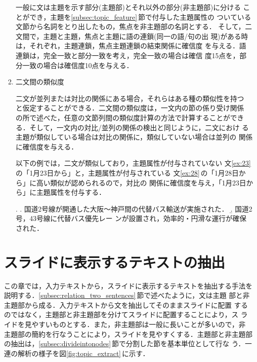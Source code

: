 \begin{enumerate}
      一般に文は主題を示す部分(主題部)とそれ以外の部分(非主題部)に分ける
      ことができ，主題を\ref{subsec:topic_feature}\,節で付与した主題属性の
      ついている文節から名詞をとり出したもの，焦点を非主題部の名詞とする．
      そして，二文間で，主題と主題，焦点と主題に語の連鎖(同一の語/句の出
      現)がある時は，それぞれ，主題連鎖，焦点主題連鎖の結束関係に確信度
      を与える．語連鎖は，完全一致と部分一致を考え，完全一致の場合は確信
      度15点を，部分一致の場合は確信度10点を与える．

\item 二文間の類似度

      二文が並列または対比の関係にある場合，それらはある種の類似性を持つ
      と仮定することができる．二文間の類似度は，一文内の節の係り受け関係
      の所で述べた，任意の文節列間の類似度計算の方法で計算することができ
      る．そして，一文内の対比/並列の関係の検出と同じように，二文におけ
      る主題が類似している場合は対比の関係に，類似していない場合は並列の
      関係に確信度を与える．

      以下の例では，二文が類似しており，主題属性が付与されていない
      文\ref{ex:23}\,の「1月23日から」と，主題属性が付与されている
      文\ref{ex:28}\,の「1月28日から」に高い類似が認められるので，対比の
      関係に確信度を与え，「1月23日から」に主題属性を付与する．

\ex. \a. 国道2号線が開通した大阪〜神戸間の代替バス輸送が実施された． \label{ex:23}
 \b. 国道2号，43号線に代替バス優先レー
      ンが設置され，効率的・円滑な運行が確保された．\label{ex:28}\\
\par

\end{enumerate}

\section{スライドに表示するテキストの抽出}
\label{sec:topic_extract}

この章では，入力テキストから，スライドに表示するテキストを抽出する手法を
説明する．\ref{subsec:relation_two_sentences}\,節で述べたように，文は主題
部と非主題部から成る．入力テキストから文を抽出してそのままスライドに配置
するのではなく，主題部と非主題部を分けてスライドに配置することにより，ス
ライドを見やすいものとする．また，非主題部は一般に長いことが多いので，非
主題部の簡約を行なうことにより，スライドを見やすくする．主題部と非主題部
の抽出は，\ref{subsec:divideintonodes}\,節で分割した節を基本単位として行な
う．一連の解析の様子を図\ref{fig:topic_extract}\,に示す．

